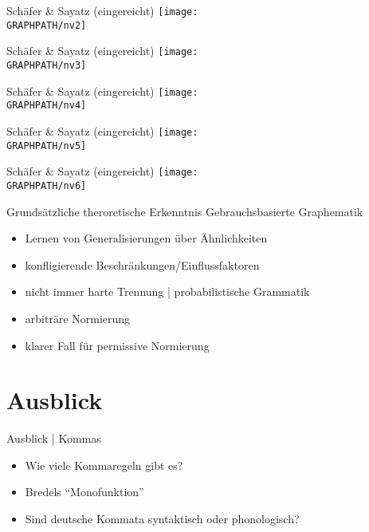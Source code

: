 \begin{frame}
  {Schäfer \& Sayatz (eingereicht)}
  \centering 
  \texttt{[image: \\GRAPHPATH/nv2]}
\end{frame}

\begin{frame}
  {Schäfer \& Sayatz (eingereicht)}
  \centering 
  \texttt{[image: \\GRAPHPATH/nv3]}
\end{frame}

\begin{frame}
  {Schäfer \& Sayatz (eingereicht)}
  \centering 
  \texttt{[image: \\GRAPHPATH/nv4]}
\end{frame}

\begin{frame}
  {Schäfer \& Sayatz (eingereicht)}
  \centering 
  \texttt{[image: \\GRAPHPATH/nv5]}
\end{frame}

\begin{frame}
  {Schäfer \& Sayatz (eingereicht)}
  \centering 
  \texttt{[image: \\GRAPHPATH/nv6]}
\end{frame}

\begin{frame}
  {Grundsätzliche theroretische Erkenntnis}
  Gebrauchsbasierte Graphematik\\
  \Zeile
  \begin{itemize}[<+->]
    \item Lernen von Generalisierungen über Ähnlichkeiten
    \item konfligierende Beschränkungen\slash Einflussfaktoren
    \item nicht immer harte Trennung | \alert{probabilistische Grammatik}
      \Zeile
    \item arbiträre Normierung
    \item klarer Fall für permissive Normierung
  \end{itemize}
\end{frame}

\section{Ausblick}

\begin{frame}
  {Ausblick | Kommas}
  \begin{itemize}[<+->]
    \item Wie viele Kommaregeln gibt es?
      \Zeile
    \item Bredels "`Monofunktion"'
      \Zeile
    \item Sind deutsche Kommata syntaktisch oder phonologisch?
  \end{itemize}
\end{frame}
